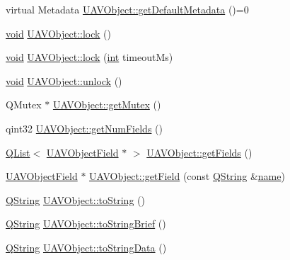 \begin{DoxyCompactItemize}
\item 
virtual Metadata \hyperlink{group___u_a_v_objects_plugin_ga565410bc4fc71be87c359024f6cc8f3c}{U\-A\-V\-Object\-::get\-Default\-Metadata} ()=0
\item 
\hyperlink{group___u_a_v_objects_plugin_ga444cf2ff3f0ecbe028adce838d373f5c}{void} \hyperlink{group___u_a_v_objects_plugin_ga02661eea30150b9d24bc3a16423850b8}{U\-A\-V\-Object\-::lock} ()
\item 
\hyperlink{group___u_a_v_objects_plugin_ga444cf2ff3f0ecbe028adce838d373f5c}{void} \hyperlink{group___u_a_v_objects_plugin_ga17770eb02bf711b734a041622dccf889}{U\-A\-V\-Object\-::lock} (\hyperlink{ioapi_8h_a787fa3cf048117ba7123753c1e74fcd6}{int} timeout\-Ms)
\item 
\hyperlink{group___u_a_v_objects_plugin_ga444cf2ff3f0ecbe028adce838d373f5c}{void} \hyperlink{group___u_a_v_objects_plugin_ga2729ba3111341341127946ff1b9bb377}{U\-A\-V\-Object\-::unlock} ()
\item 
Q\-Mutex $\ast$ \hyperlink{group___u_a_v_objects_plugin_ga07e3fbd0f6a85b23e03afc165456a0ef}{U\-A\-V\-Object\-::get\-Mutex} ()
\item 
qint32 \hyperlink{group___u_a_v_objects_plugin_gab9b1f7925306319ea21f599bba0d227f}{U\-A\-V\-Object\-::get\-Num\-Fields} ()
\item 
\hyperlink{class_q_list}{Q\-List}$<$ \hyperlink{class_u_a_v_object_field}{U\-A\-V\-Object\-Field} $\ast$ $>$ \hyperlink{group___u_a_v_objects_plugin_ga043de5085e6ade44abfb005e320d10ca}{U\-A\-V\-Object\-::get\-Fields} ()
\item 
\hyperlink{class_u_a_v_object_field}{U\-A\-V\-Object\-Field} $\ast$ \hyperlink{group___u_a_v_objects_plugin_ga0c8a0350ce2c49430124b59842fff131}{U\-A\-V\-Object\-::get\-Field} (const \hyperlink{group___u_a_v_objects_plugin_gab9d252f49c333c94a72f97ce3105a32d}{Q\-String} \&\hyperlink{glext_8h_ad977737dfc9a274a62741b9500c49a32}{name})
\item 
\hyperlink{group___u_a_v_objects_plugin_gab9d252f49c333c94a72f97ce3105a32d}{Q\-String} \hyperlink{group___u_a_v_objects_plugin_ga35168dca4d7a9e25bd117d52a66a2253}{U\-A\-V\-Object\-::to\-String} ()
\item 
\hyperlink{group___u_a_v_objects_plugin_gab9d252f49c333c94a72f97ce3105a32d}{Q\-String} \hyperlink{group___u_a_v_objects_plugin_gadc4ce5f3b6b9ea7b5d0792bba38cd865}{U\-A\-V\-Object\-::to\-String\-Brief} ()
\item 
\hyperlink{group___u_a_v_objects_plugin_gab9d252f49c333c94a72f97ce3105a32d}{Q\-String} \hyperlink{group___u_a_v_objects_plugin_gaba674d61ed55f37ab245564c6d05ec72}{U\-A\-V\-Object\-::to\-String\-Data} ()

\end{DoxyCompactItemize}
